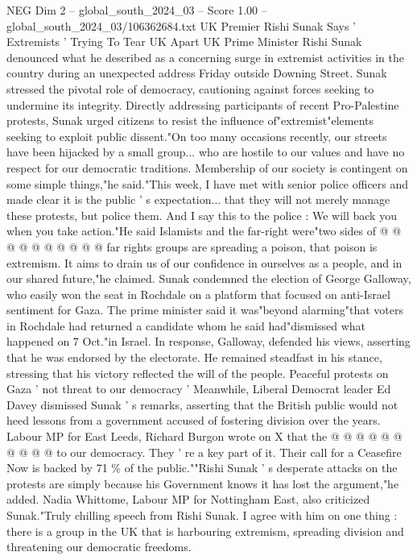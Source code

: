 \begin{textsample}{NEG Dim 2 – global\_south\_2024\_03 – Score 1.00 – global\_south\_2024\_03/106362684.txt}  \label{ex:f2_neg_430}
UK Premier Rishi Sunak Says ' Extremists ' Trying To Tear UK Apart UK Prime Minister Rishi Sunak denounced what he described as a concerning surge in extremist activities in the country during an unexpected address Friday outside Downing Street.
Sunak stressed the pivotal role of democracy, cautioning against forces seeking to undermine its integrity.
Directly addressing participants of recent Pro-Palestine protests, Sunak urged citizens to resist the influence of"extremist"elements seeking to exploit public dissent."On too many occasions recently, our streets have been hijacked by a small group... who are hostile to our values and have no respect for our democratic traditions.
Membership of our society is contingent on some simple things,"he said."This week, I have met with senior police officers and made clear it is the public ' s expectation... that they will not merely manage these protests, but police them.
And I say this to the police : We will back you when you take action."He said Islamists and the far-right were"two sides of @ @ @ @ @ @ @ @ @ @ far rights groups are spreading a poison, that poison is extremism.
It aims to drain us of our confidence in ourselves as a people, and in our shared future,"he claimed.
Sunak condemned the election of George Galloway, who easily won the seat in Rochdale on a platform that focused on anti-Israel sentiment for Gaza.
The prime minister said it was"beyond alarming"that voters in Rochdale had returned a candidate whom he said had"dismissed what happened on 7 Oct."in Israel.
In response, Galloway, defended his views, asserting that he was endorsed by the electorate.
He remained steadfast in his stance, stressing that his victory reflected the will of the people.
Peaceful protests on Gaza ' not threat to our democracy ' Meanwhile, Liberal Democrat leader Ed Davey dismissed Sunak ' s remarks, asserting that the British public would not heed lessons from a government accused of fostering division over the years.
Labour MP for East Leeds, Richard Burgon wrote on X that the @ @ @ @ @ @ @ @ @ @ to our democracy.
They ' re a key part of it.
Their call for a Ceasefire Now is backed by 71 \% of the public.""Rishi Sunak ' s desperate attacks on the protests are simply because his Government knows it has lost the argument,"he added.
Nadia Whittome, Labour MP for Nottingham East, also criticized Sunak."Truly chilling speech from Rishi Sunak.
I agree with him on one thing : there is a group in the UK that is harbouring extremism, spreading division and threatening our democratic freedoms.

\end{textsample}
